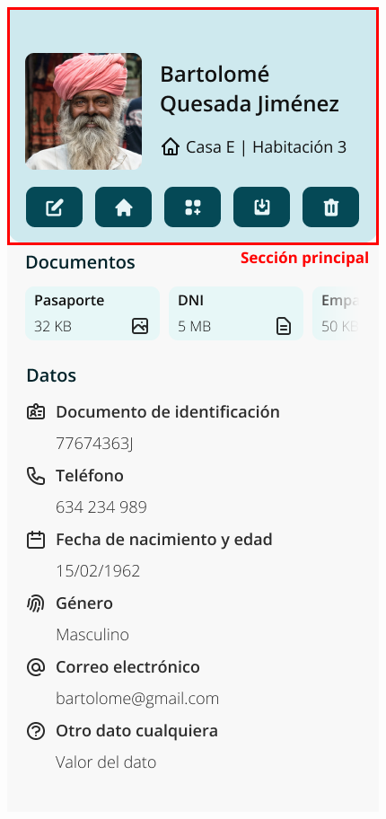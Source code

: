 \begin{figure}[h!]
    \endminipage\hfill
        \centering
        \includegraphics[width=\linewidth]{diseno/app/presentacion/secciones-elemento.png}

\end{figure}

